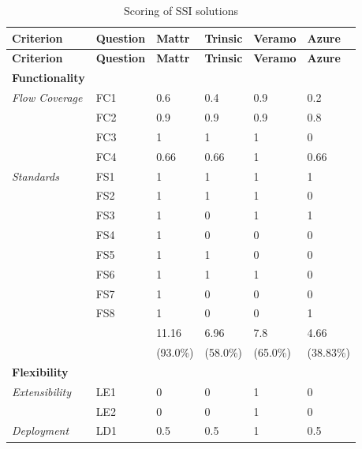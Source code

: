     \setlength\LTleft{0pt}
    \setlength\LTright{0pt}
    \begin{longtable}{@{\extracolsep{\fill}}llllll@{}}
        \caption{Scoring of \acs{SSI} solutions}
        \label{tab: scores}\\
        \toprule
        \textbf{Criterion}     & \textbf{Question} & \textbf{Mattr} & \textbf{Trinsic} & \textbf{Veramo} & \textbf{Azure} \\ \midrule
        \endfirsthead
        \toprule
        \textbf{Criterion}     & \textbf{Question} & \textbf{Mattr} & \textbf{Trinsic} & \textbf{Veramo} & \textbf{Azure} \\ \midrule
        \endhead
        \textbf{Functionality} &&&&&\\
        \textit{Flow Coverage} & FC1 & 0.6 & 0.4 & 0.9 & 0.2 \\
                               & FC2 & 0.9 & 0.9 & 0.9 & 0.8 \\
                               & FC3 & 1 & 1 & 1 & 0 \\
                               & FC4 & 0.66 & 0.66 & 1 & 0.66 \\
        \textit{Standards}     & FS1 & 1 & 1 & 1 & 1 \\
                               & FS2 & 1 & 1 & 1 & 0 \\
                               & FS3 & 1 & 0 & 1 & 1 \\
                               & FS4 & 1 & 0 & 0 & 0 \\
                               & FS5 & 1 & 1 & 0 & 0 \\
                               & FS6 & 1 & 1 & 1 & 0 \\
                               & FS7 & 1 & 0 & 0 & 0 \\
                               & FS8 & 1 & 0 & 0 & 1 \\
                               \hline
                               && 11.16 & 6.96 & 7.8 & 4.66\\
                               && (93.0\%) & (58.0\%) & (65.0\%) & (38.83\%) \\                               
                               \midrule
        \textbf{Flexibility} &&&&&\\
        \textit{Extensibility} & LE1 & 0 & 0 & 1 & 0 \\
                               & LE2 & 0 & 0 & 1 & 0 \\
        \textit{Deployment}    & LD1 & 0.5 & 0.5 & 1 & 0.5 \\

\end{longtable}
